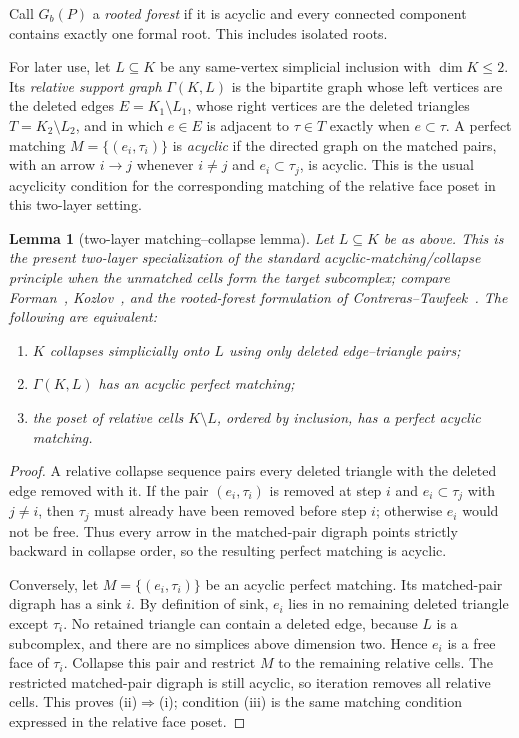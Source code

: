 \documentclass[11pt]{article}
\newtheorem{lemma}[theorem]{Lemma}
\theoremstyle{definition}
\theoremstyle{remark}
\begin{document}
Call $G_b(P)$ a \emph{rooted forest} if it is acyclic and every connected component
contains exactly one formal root.  This includes isolated roots.

For later use, let $L\subseteq K$ be any same-vertex simplicial inclusion with
$\dim K\le2$.  Its \emph{relative support graph} $\Gamma(K,L)$ is the bipartite graph
whose left vertices are the deleted edges $E=K_1\setminus L_1$, whose right vertices
are the deleted triangles $T=K_2\setminus L_2$, and in which $e\in E$ is adjacent to
$\tau\in T$ exactly when $e\subset\tau$.  A perfect matching
$M=\{(e_i,\tau_i)\}$ is \emph{acyclic} if the directed graph on the matched pairs,
with an arrow $i\to j$ whenever $i\ne j$ and $e_i\subset\tau_j$, is acyclic.  This is
the usual acyclicity condition for the corresponding matching of the relative face
poset in this two-layer setting.

\begin{lemma}[two-layer matching--collapse lemma]\label{lem:matching-collapse}
Let $L\subseteq K$ be as above.  This is the present two-layer specialization of the
standard acyclic-matching/collapse principle when the unmatched cells form the target
subcomplex; compare Forman~\cite{Forman1998}, Kozlov~\cite{Kozlov2008}, and the
rooted-forest formulation of Contreras--Tawfeek~\cite{ContrerasTawfeek2024}.  The
following are equivalent:
\begin{enumerate}[label=(\roman*)]
\item $K$ collapses simplicially onto $L$ using only deleted edge--triangle pairs;
\item $\Gamma(K,L)$ has an acyclic perfect matching;
\item the poset of relative cells $K\setminus L$, ordered by inclusion, has a perfect
acyclic matching.
\end{enumerate}
\end{lemma}

\begin{proof}
A relative collapse sequence pairs every deleted triangle with the deleted edge removed
with it.  If the pair $(e_i,\tau_i)$ is removed at step $i$ and $e_i\subset\tau_j$
with $j\ne i$, then $\tau_j$ must already have been removed before step $i$; otherwise
$e_i$ would not be free.  Thus every arrow in the matched-pair digraph points strictly
backward in collapse order, so the resulting perfect matching is acyclic.

Conversely, let $M=\{(e_i,\tau_i)\}$ be an acyclic perfect matching.  Its
matched-pair digraph has a sink $i$.  By definition of sink, $e_i$ lies in no remaining
deleted triangle except $\tau_i$.  No retained triangle can contain a deleted edge,
because $L$ is a subcomplex, and there are no simplices above dimension two.  Hence
$e_i$ is a free face of $\tau_i$.  Collapse this pair and restrict $M$ to the remaining
relative cells.  The restricted matched-pair digraph is still acyclic, so iteration
removes all relative cells.  This proves (ii)$\Rightarrow$(i); condition (iii) is the
same matching condition expressed in the relative face poset.
\end{proof}
\end{document}

